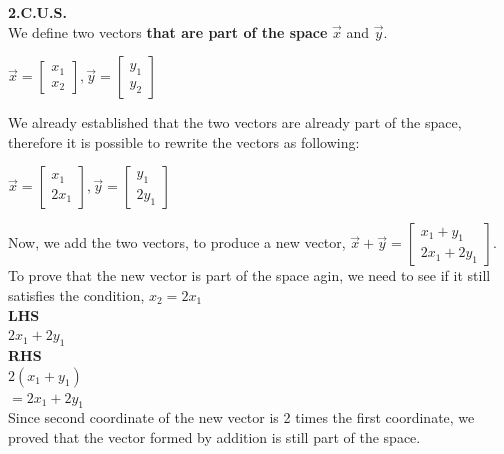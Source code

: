 \documentclass[12pt]{article}
\begin{document}
\noindent
\textbf{2.C.U.S.}\\
We define two vectors \textbf{that are part of the space} $\vec{x}$ and $\vec{y}$.\\
\begin{centering}
$\vec{x} = \begin{bmatrix}x_1\\x_2\end{bmatrix}, \vec{y} = \begin{bmatrix}y_1\\y_2\end{bmatrix}$
\end{centering}
We already established that the two vectors are already part of the space, therefore it is possible to rewrite the vectors as following:\\
\begin{centering}
$\vec{x} = \begin{bmatrix}x_1\\2x_1\end{bmatrix}, \vec{y} = \begin{bmatrix}y_1\\2y_1\end{bmatrix}$
\end{centering}
Now, we add the two vectors, to produce a new vector, $\vec{x}+\vec{y}=\begin{bmatrix}x_1+y_1\\2x_1+2y_1\end{bmatrix}$.
To prove that the new vector is part of the space agin, we need to see if it still satisfies the condition, $x_2=2x_1$\\
\textbf{LHS}\\
$2x_1+2y_1$\\
\textbf{RHS}\\
$2(x_1+y_1)$\\
$=2x_1+2y_1$\\
Since second coordinate of the new vector is 2 times the first coordinate, we proved that the vector formed by addition is still part of the space.\\
\end{document}
